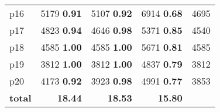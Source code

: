 \begin{tabular}{|l|rrr|r|}
p16 & {\footnotesize 5179} \textbf{0.91} & {\footnotesize 5107} \textbf{0.92} & {\footnotesize 6914} \textbf{0.68} & 4695\\
p17 & {\footnotesize 4823} \textbf{0.94} & {\footnotesize 4646} \textbf{0.98} & {\footnotesize 5371} \textbf{0.85} & 4540\\
p18 & {\footnotesize 4585} \textbf{1.00} & {\footnotesize 4585} \textbf{1.00} & {\footnotesize 5671} \textbf{0.81} & 4585\\
p19 & {\footnotesize 3812} \textbf{1.00} & {\footnotesize 3812} \textbf{1.00} & {\footnotesize 4837} \textbf{0.79} & 3812\\
p20 & {\footnotesize 4173} \textbf{0.92} & {\footnotesize 3923} \textbf{0.98} & {\footnotesize 4991} \textbf{0.77} & 3853\\
\hline
\textbf{total} & \textbf{18.44} & \textbf{18.53} & \textbf{15.80} & \\
\hline
\end{tabular}

